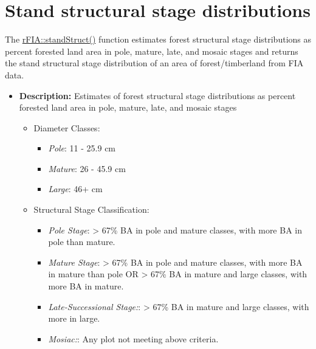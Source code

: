 \documentclass[
]{book}
\providecommand{\tightlist}{%
  \setlength{\itemsep}{0pt}\setlength{\parskip}{0pt}}
\begin{document}
\hypertarget{stand-structural-stage-distributions}{%
\section{Stand structural stage distributions}\label{stand-structural-stage-distributions}}

The \href{https://rdrr.io/cran/rFIA/man/standStruct.html}{rFIA::standStruct()} function estimates forest structural stage distributions as percent forested land area in pole, mature, late, and mosaic stages and returns the stand structural stage distribution of an area of forest/timberland from FIA data.

\begin{itemize}
\tightlist
\item
  \textbf{Description:} Estimates of forest structural stage distributions as percent forested land area in pole, mature, late, and mosaic stages

  \begin{itemize}
  \item
    Diameter Classes:

    \begin{itemize}
    \tightlist
    \item
      \emph{Pole}: 11 - 25.9 cm
    \item
      \emph{Mature}: 26 - 45.9 cm
    \item
      \emph{Large}: 46+ cm
    \end{itemize}
  \item
    Structural Stage Classification:

    \begin{itemize}
    \tightlist
    \item
      \emph{Pole Stage}: \textgreater{} 67\% BA in pole and mature classes, with more BA in pole than mature.
    \item
      \emph{Mature Stage}: \textgreater{} 67\% BA in pole and mature classes, with more BA in mature than pole OR \textgreater{} 67\% BA in mature and large classes, with more BA in mature.
    \item
      \emph{Late-Successional Stage:}: \textgreater{} 67\% BA in mature and large classes, with more in large.
    \item
      \emph{Mosiac:}: Any plot not meeting above criteria.
    \end{itemize}
  \end{itemize}
\end{itemize}
\end{document}

